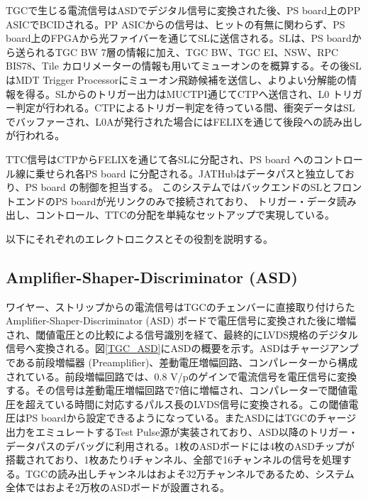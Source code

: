 TGCで生じる電流信号はASDでデジタル信号に変換された後、PS board上のPP ASICでBCIDされる。PP ASICからの信号は、ヒットの有無に関わらず、PS board上のFPGAから光ファイバーを通じてSLに送信される。SLは、PS boardから送られるTGC BW 7層の情報に加え、TGC BW、TGC EI、NSW、RPC BIS78、Tile カロリメーターの情報も用いてミューオンの\pt を概算する。その後SLはMDT Trigger Processorにミューオン飛跡候補を送信し、よりよい\pt 分解能の情報を得る。SLからのトリガー出力はMUCTPI通じてCTPへ送信され、L0 トリガー判定が行われる。CTPによるトリガー判定を待っている間、衝突データはSLでバッファーされ、L0Aが発行された場合にはFELIXを通じて後段への読み出しが行われる。

TTC信号はCTPからFELIXを通じて各SLに分配され、PS board へのコントロール線に乗せられ各PS board に分配される。JATHubはデータパスと独立しており、PS board の制御を担当する。
このシステムではバックエンドのSLとフロントエンドのPS boardが光リンクのみで接続されており、
トリガー・データ読み出し、コントロール、TTCの分配を単純なセットアップで実現している。

以下にそれぞれのエレクトロニクスとその役割を説明する。

        \subsection*{Amplifier-Shaper-Discriminator (ASD)}
    ワイヤー、ストリップからの電流信号はTGCのチェンバーに直接取り付けらたAmplifier-Shaper-Discriminator  (ASD) ボードで電圧信号に変換された後に増幅され、閾値電圧との比較による信号識別を経て、最終的にLVDS規格のデジタル信号へ変換される。図\ref{TGC_ASD}にASDの概要を示す。ASDはチャージアンプである前段増幅器 (Preamplifier)、差動電圧増幅回路、コンパレーターから構成されている。前段増幅回路では、0.8 V/pのゲインで電流信号を電圧信号に変換する。その信号は差動電圧増幅回路で7倍に増幅され、コンパレーターで閾値電圧を超えている時間に対応するパルス長のLVDS信号に変換される。この閾値電圧はPS boardから設定できるようになっている。またASDにはTGCのチャージ出力をエミュレートするTest Pulse源が実装されており、ASD以降のトリガー・データパスのデバッグに利用される。1枚のASDボードには4枚のASDチップが搭載されており、1枚あたり4チャンネル、全部で16チャンネルの信号を処理する。TGCの読み出しチャンネルはおよそ32万チャンネルであるため、システム全体ではおよそ2万枚のASDボードが設置される。

